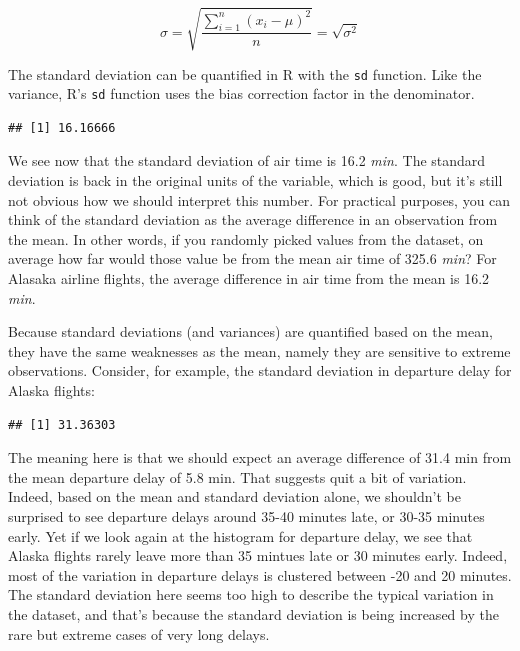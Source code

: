 \documentclass[
]{book}
\newenvironment{Shaded}{\begin{snugshade}}{\end{snugshade}}
\newcommand{\AttributeTok}[1]{\textcolor[rgb]{0.13,0.29,0.53}{#1}}
\newcommand{\FunctionTok}[1]{\textcolor[rgb]{0.13,0.29,0.53}{\textbf{#1}}}
\newcommand{\NormalTok}[1]{#1}
\newcommand{\SpecialCharTok}[1]{\textcolor[rgb]{0.81,0.36,0.00}{\textbf{#1}}}
\begin{document}
\[
\sigma = \sqrt{\frac{\sum_{i=1}^n (x_i - \mu)^2}{n}}=\sqrt{\sigma^2}
\]

The standard deviation can be quantified in R with the \texttt{sd} function. Like the variance, R's \texttt{sd} function uses the bias correction factor in the denominator.

\begin{Shaded}
\end{Shaded}

\begin{verbatim}
## [1] 16.16666
\end{verbatim}

We see now that the standard deviation of air time is 16.2 \emph{min}. The standard deviation is back in the original units of the variable, which is good, but it's still not obvious how we should interpret this number. For practical purposes, you can think of the standard deviation as the average difference in an observation from the mean. In other words, if you randomly picked values from the dataset, on average how far would those value be from the mean air time of 325.6 \emph{min}? For Alasaka airline flights, the average difference in air time from the mean is 16.2 \emph{min}.

Because standard deviations (and variances) are quantified based on the mean, they have the same weaknesses as the mean, namely they are sensitive to extreme observations. Consider, for example, the standard deviation in departure delay for Alaska flights:

\begin{Shaded}
\end{Shaded}

\begin{verbatim}
## [1] 31.36303
\end{verbatim}

The meaning here is that we should expect an average difference of 31.4 min from the mean departure delay of 5.8 min. That suggests quit a bit of variation. Indeed, based on the mean and standard deviation alone, we shouldn't be surprised to see departure delays around 35-40 minutes late, or 30-35 minutes early. Yet if we look again at the histogram for departure delay, we see that Alaska flights rarely leave more than 35 mintues late or 30 minutes early. Indeed, most of the variation in departure delays is clustered between -20 and 20 minutes. The standard deviation here seems too high to describe the typical variation in the dataset, and that's because the standard deviation is being increased by the rare but extreme cases of very long delays.
\end{document}
